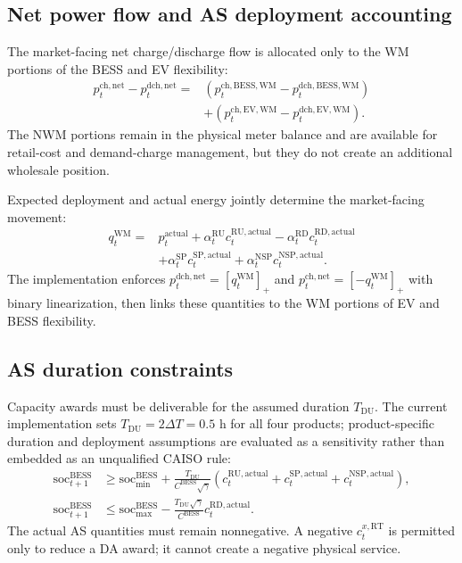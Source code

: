 \documentclass[final,5p,times]{elsarticle}
\newcommand{\EV}{\mathrm{EV}}
\newcommand{\BESS}{\mathrm{BESS}}
\newcommand{\RT}{\mathrm{RT}}
\newcommand{\soc}{\mathrm{soc}}
\newcommand{\RU}{\mathrm{RU}}
\newcommand{\RD}{\mathrm{RD}}
\newcommand{\SP}{\mathrm{SP}}
\newcommand{\NSP}{\mathrm{NSP}}
\newcommand{\WM}{\mathrm{WM}}
\newcommand{\ch}{\mathrm{ch}}
\newcommand{\dch}{\mathrm{dch}}
\newcommand{\net}{\mathrm{net}}
\newcommand{\pos}[1]{\left[#1\right]_+}
\begin{document}
\subsection{Net power flow and AS deployment accounting}
The market-facing net charge/discharge flow is allocated only to the WM portions of the BESS and EV flexibility:
\begin{align}
p_t^{\ch,\net}-p_t^{\dch,\net}
={}&\left(p_t^{\ch,\BESS,\WM}-p_t^{\dch,\BESS,\WM}\right)\nonumber\\
&+\left(p_t^{\ch,\EV,\WM}-p_t^{\dch,\EV,\WM}\right).
\label{eq:app_net_wm_flow}
\end{align}
The NWM portions remain in the physical meter balance and are available for retail-cost and demand-charge management, but they do not create an additional wholesale position.

Expected deployment and actual energy jointly determine the market-facing movement:
\begin{align}
q_t^{\WM}={}&p_t^{\mathrm{actual}}
+\alpha_t^{\RU}c_t^{\RU,\mathrm{actual}}
-\alpha_t^{\RD}c_t^{\RD,\mathrm{actual}}\nonumber\\
&+\alpha_t^{\SP}c_t^{\SP,\mathrm{actual}}
+\alpha_t^{\NSP}c_t^{\NSP,\mathrm{actual}}.\label{eq:app_deploy}
\end{align}
The implementation enforces $p_t^{\dch,\net}=\pos{q_t^{\WM}}$ and $p_t^{\ch,\net}=\pos{-q_t^{\WM}}$ with binary linearization, then links these quantities to the WM portions of EV and BESS flexibility.

\subsection{AS duration constraints}
Capacity awards must be deliverable for the assumed duration
$T_{\mathrm{DU}}$. The current implementation sets
$T_{\mathrm{DU}}=2\Delta T=0.5$ h for all four products; product-specific
duration and deployment assumptions are evaluated as a sensitivity rather than
embedded as an unqualified CAISO rule:
\begin{align}
\soc_{t+1}^{\BESS}
&\ge \soc_{\min}^{\BESS}+\frac{T_{\mathrm{DU}}}{C^{\BESS}\sqrt{\gamma}}
\left(c_t^{\RU,\mathrm{actual}}+c_t^{\SP,\mathrm{actual}}+c_t^{\NSP,\mathrm{actual}}\right),\label{eq:app_duration_up}\\
\soc_{t+1}^{\BESS}
&\le \soc_{\max}^{\BESS}-\frac{T_{\mathrm{DU}}\sqrt{\gamma}}{C^{\BESS}}c_t^{\RD,\mathrm{actual}}.\label{eq:app_duration_down}
\end{align}
The actual AS quantities must remain nonnegative. A negative $c_t^{x,\RT}$ is permitted only to reduce a DA award; it cannot create a negative physical service.
\end{document}
